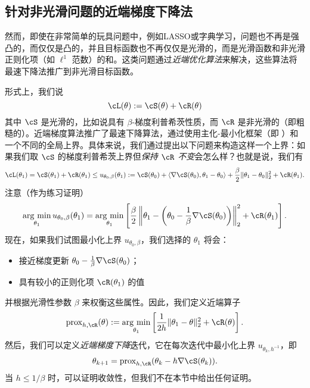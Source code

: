 \documentclass[../../book-main.tex]{subfiles}
\begin{document}
\subsection{针对非光滑问题的近端梯度下降法}\label{subsec:pgd}

然而，即使在非常简单的玩具问题中，例如LASSO或字典学习，问题也不再是强凸的，而仅仅是凸的，并且目标函数也不再仅仅是光滑的，而是光滑函数和非光滑正则化项（如 \(\ell^{1}\) 范数）的和。这类问题通过\textit{近端优化算法}来解决，这些算法将最速下降法推广到非光滑目标函数。

形式上，我们说
\begin{equation}
    \cL(\theta) := \cS(\theta) + \cR(\theta)
\end{equation}
其中 \(\cS\) 是光滑的，比如说具有 \(\beta\)-梯度利普希茨性质，而 \(\cR\) 是非光滑的（即粗糙的）。近端梯度算法推广了最速下降算法，通过使用主化-最小化框架（即 ）和一个不同的全局上界。具体来说，我们通过提出以下问题来构造这样一个上界：如果我们取 \(\cS\) 的梯度利普希茨上界但\textit{保持 \(\cR\) 不变}会怎么样？也就是说，我们有
\begin{equation}
    \cL(\theta_{1}) = \cS(\theta_{1}) + \cR(\theta_{1}) \leq u_{\theta_{0}, \beta}(\theta_{1}) := \cS(\theta_{0}) + \ip{\nabla \cS(\theta_{0})}{\theta_{1} - \theta_{0}} + \frac{\beta}{2}\norm{\theta_{1} - \theta_{0}}_{2}^{2} + \cR(\theta_{1}).
\end{equation}
注意（作为练习证明）
\begin{equation}
    \argmin_{\theta_{1}}u_{\theta_{0}, \beta}(\theta_{1}) = \argmin_{\theta_{1}}\bs{\frac{\beta}{2}\norm*{\theta_{1} - \bp{\theta_{0} - \frac{1}{\beta}\nabla \cS(\theta_{0})}}_{2}^{2} + \cR(\theta_{1})}.
\end{equation}
现在，如果我们试图最小化上界 \(u_{\theta_{0}, \beta}\)，我们选择的 \(\theta_{1}\) 将会：
\begin{itemize}
    \item 接近梯度更新 \(\theta_{0} - \frac{1}{\beta}\nabla \cS(\theta_{0})\)；
    \item 具有较小的正则化项 \(\cR(\theta_{1})\) 的值
\end{itemize}
并根据光滑性参数 \(\beta\) 来权衡这些属性。因此，我们定义近端算子
\begin{equation}
    \prox_{h, \cR}(\theta) := \argmin_{\theta_{1}}\bs{\frac{1}{2h}\norm{\theta_{1} - \theta}_{2}^{2} + \cR(\theta)}.
\end{equation}
然后，我们可以定义\textit{近端梯度下降}迭代，它在每次迭代中最小化上界 \(u_{\theta_{k}, h^{-1}}\)，即
\begin{equation}
    \theta_{k + 1} = \prox_{h, \cR}(\theta_{k} - h\nabla \cS(\theta_{k})).
\end{equation}
当 \(h \leq 1/\beta\) 时，可以证明收敛性，但我们不在本节中给出任何证明。
\end{document}
